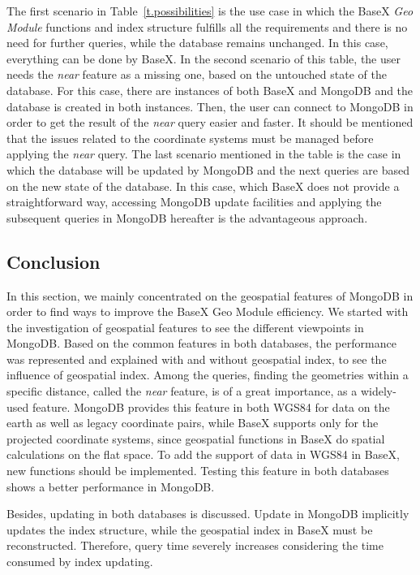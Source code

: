 \documentclass[a4paper,12pt]{article}
\begin{document}
The first scenario in Table~\ref{t.possibilities} is the use case in which the BaseX \textit{Geo Module} functions and index structure fulfills all the requirements and there is no need for further queries, while the database remains unchanged. In this case, everything can be done by BaseX. In the second scenario of this table, the user needs the \textit{near} feature as a missing one, based on the untouched state of the database. For this case, there are instances of both BaseX and MongoDB and the database is created in both instances. Then, the user can connect to MongoDB in order to get the result of the \textit{near} query easier and faster. It should be mentioned that the issues related to the coordinate systems must be managed before applying the \textit{near} query. The last scenario mentioned in the table is the case in which the database will be updated by MongoDB and the next queries are based on the new state of the database. In this case, which BaseX does not provide a straightforward way, accessing MongoDB update facilities and applying the subsequent queries in MongoDB hereafter is the advantageous approach. 

\subsection{Conclusion}
\label{conc}
In this section, we mainly concentrated on the geospatial features of MongoDB in order to find ways to improve the BaseX Geo Module efficiency. We started with the investigation of geospatial features to see the different viewpoints in MongoDB. Based on the common features in both databases, the performance was represented and explained with and without geospatial index, to see the influence of geospatial index.
Among the queries, finding the geometries within a specific distance, called the \textit{near} feature, is of a great importance, as a widely-used feature. MongoDB provides this feature in both WGS84 for data on the earth as well as legacy coordinate pairs, while BaseX supports only for the projected coordinate systems, since geospatial functions in BaseX do spatial calculations on the flat space. To add the support of data in WGS84 in BaseX, new functions should be implemented. Testing this feature in both databases shows a better performance in MongoDB. 

Besides, updating in both databases is discussed. Update in MongoDB implicitly updates the index structure, while the geospatial index in BaseX must be re\-constructed. Therefore, query time severely increases considering the time consumed by index updating. 
\end{document}
